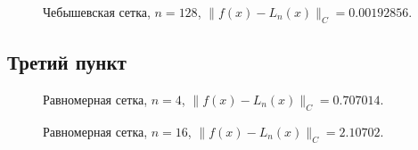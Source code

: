 \documentclass[12pt, a4paper]{article}
\begin{document}
\begin{figure}[h]
    \caption{Чебышевская сетка, $n = 128$, $ \| f(x) - L_n(x)  \|_C = 0.00192856 $.}
\end{figure}

\pagebreak



\subsection{Третий пункт}

\begin{figure}[h]
    \caption{Равномерная сетка, $n = 4$, $ \| f(x) - L_n(x)  \|_C = 0.707014 $.}
\end{figure}

\begin{figure}[h]
    \caption{Равномерная сетка, $n = 16$, $ \| f(x) - L_n(x)  \|_C = 2.10702 $.}
\end{figure}
\end{document}
